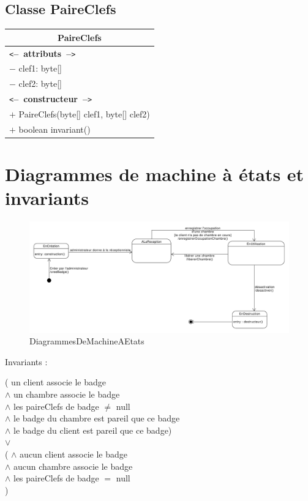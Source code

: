 \documentclass[11pt,article]{article}
\newcommand{\cmt}[1]{\texttt{<}\textbf{--~#1~--}\texttt{>}}
\begin{document}
  \subsection{Classe \textsf{PaireClefs}}
  \begin{center}
	  \begin{longtable}{|p{15cm}|}
		  \hline
		  \multicolumn{1}{|c|}{{\Large \textsf{PaireClefs}}} \\
		  \hline
		  \cmt{attributs}\\
		  $-$ clef1: byte[] \\
		  $-$ clef2: byte[] \\
		  \hline
		  \cmt{constructeur} \\
		  $+$ PaireClefs(byte[] clef1, byte[] clef2) \\
		  $+$ boolean invariant() \\
		  \hline
	  \end{longtable}
  \end{center}


\section{Diagrammes de machine à états et invariants}


\begin{figure}[h!]
  \includegraphics[width=1.3\textwidth,center]{DiagrammesDeMachineAEtats/badge_d_acces}
  \caption{DiagrammesDeMachineAEtats}
  \label{badge_d_acces}

\end{figure}
\bigskip



Invariants :
\bigskip

					( un client associe le badge \\
									\hspace{1cm} $\land$ un chambre associe le badge\\
									\hfill $\land$ les paireClefs de badge $\neq$ null\\
									$\land$ le badge du chambre est pareil que ce badge\\
									$\land$ le badge du client est pareil que ce badge)\\
							$\lor$ \\ (
									$\land$ aucun client associe le badge\\
									$\land$ aucun chambre associe le badge\\
									$\land$ les paireClefs de badge $=$ null\\
							)
\end{document}
